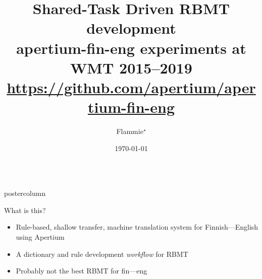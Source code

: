 \documentclass[final,hyperref={pdfpagelabels}]{beamer}
\title[apertium-fin-eng]{{\huge Shared-Task Driven RBMT development}\\
apertium-fin-eng experiments at WMT 2015--2019
\url{https://github.com/apertium/apertium-fin-eng}}
\author[flammie@iki.fi]{Flammie$^\star$ }
\institute[Uni. Hamburg]{$^\star$ Universität Hamburg}
\date{\today}
\newlength{\columnheight}
\begin{document}
\begin{frame}
      \begin{columns}
      \begin{column}{.49\textwidth}
      \begin{beamercolorbox}[center,wd=\textwidth]{postercolumn}
          \begin{minipage}[T]{.95\textwidth}  %
          \parbox[t][\columnheight]{\textwidth}{%
        \begin{block}{What is this?}
            \begin{itemize}
                \item Rule-based, shallow transfer, machine translation system
                    for Finnish---English using Apertium
                \item A dictionary and rule development \emph{workflow} for RBMT
                \item Probably not the best RBMT for fin---eng
            \end{itemize}
        \end{block}


}
\end{minipage}
\end{beamercolorbox}
\end{column}
\end{columns}
\end{frame}
\end{document}
